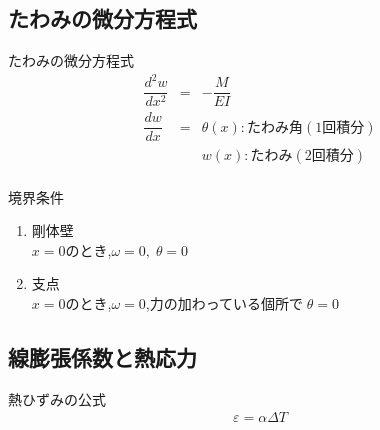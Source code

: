 \documentclass[a4paper]{jsarticle}
\begin{document}
\subsection{たわみの微分方程式}
\begin{itembox}[l]{たわみの微分方程式}
    \begin{eqnarray*}
        \dfrac{d^2w}{dx^2}&=&-\dfrac{M}{EI}\\
        \dfrac{dw}{dx}&=&\theta\left(x\right):たわみ角 (1回積分)\\
        &&w\left(x\right):たわみ(2回積分)\\
    \end{eqnarray*}
\end{itembox}
\begin{itembox}[l]{境界条件}
    \begin{enumerate}[(1)]
        \item 剛体壁\\
              $x=0$のとき,\quad$\omega=0,\;\theta=0$
        \item 支点\\
              $x=0$のとき,\quad$\omega=0$,力の加わっている個所で$\;\theta =0$
    \end{enumerate}
\end{itembox}
\subsection{線膨張係数と熱応力}
\begin{itembox}[l]{熱ひずみの公式}
    \begin{eqnarray*}
        \varepsilon=\alpha\Delta T\\
    \end{eqnarray*}
\end{itembox}
\newpage
\end{document}
